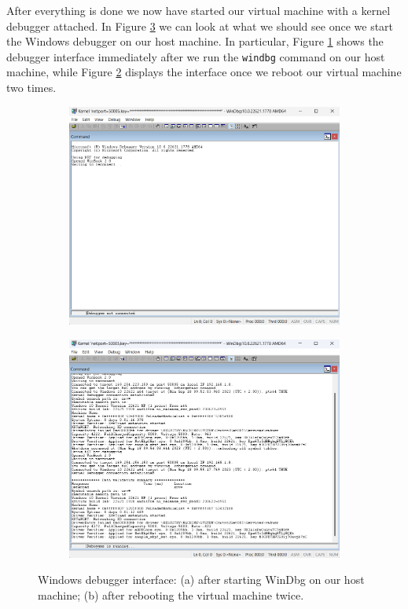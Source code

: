 After everything is done we now have started our virtual machine with a kernel debugger attached.
In Figure \ref{fig:WinDbg} we can look at what we should see once we start the Windows debugger on our host machine.
In particular, Figure \ref{fig:WinDbgNc} shows the debugger interface immediately after we run the \colorbox{backcolour}{\lstinline[style=commandline, language=bash, breaklines=true]|windbg|} command on our host machine, while Figure \ref{fig:WinDbgR} displays the interface once we reboot our virtual machine two times.

\begin{figure}[h]
	\centering
	\begin{subfigure}{.5\textwidth}
		\centering
		\includegraphics[width=0.9\linewidth]{images/WindowsDevelopment/WinDbg_nc.png}
		\caption{}
		\label{fig:WinDbgNc}
	\end{subfigure}%
	\begin{subfigure}{.5\textwidth}
		\centering
		\includegraphics[width=0.9\linewidth]{images/WindowsDevelopment/WinDbg_r.png}
		\caption{}
		\label{fig:WinDbgR}
	\end{subfigure}	
	\caption{Windows debugger interface: (a) after starting WinDbg on our host machine; (b) after rebooting the virtual machine twice.}
	\label{fig:WinDbg}
\end{figure}

